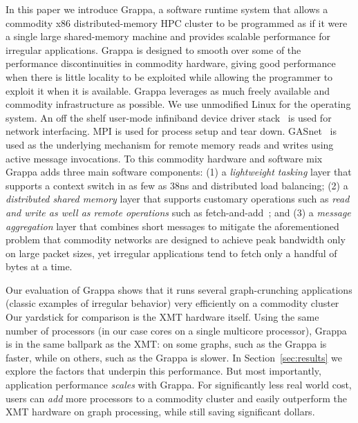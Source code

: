 In this paper we introduce Grappa, a software runtime system that allows
a commodity x86 distributed-memory HPC cluster to be programmed as if it
were a single large shared-memory machine and provides scalable
performance for irregular applications. Grappa is designed to smooth
over some of the performance discontinuities in commodity hardware,
giving good performance when there is little locality to be exploited
while allowing the programmer to exploit it when it is available. Grappa
leverages as much freely available and commodity infrastructure as
possible. We use unmodified Linux for the operating system. An off the
shelf user-mode infiniband device driver stack~\cite{OFED} is used
for network interfacing. MPI is used for process setup and
tear down. GASnet~\cite{gasnet:spec} is used as the underlying mechanism for
remote memory reads and writes using active message invocations. To this
commodity hardware and software mix Grappa adds three main software
components: (1) a \emph{lightweight tasking} layer that supports a
context switch in as few as 38ns and distributed load balancing; (2) a
\emph{distributed shared memory} layer that supports customary
operations such as \emph{read and write as well as remote operations}
such as fetch-and-add~\cite{fetchandadd}; and (3) a \emph{message
aggregation} layer that combines short messages to mitigate the
aforementioned problem that commodity networks are designed to achieve
peak bandwidth only on large packet sizes, yet irregular applications
tend to fetch only a handful of bytes at a time.


% 
% 

Our evaluation of Grappa shows that it runs several graph-crunching applications (classic examples of irregular behavior) very efficiently on a commodity cluster  Our yardstick for comparison is the XMT hardware itself.  Using the same number of processors (in our case cores on a single multicore processor), Grappa is in the same ballpark as the XMT: on some graphs, such as the  Grappa is  faster, while on others, such as the  Grappa is  slower.  In Section~\ref{sec:results} we explore the factors that underpin this performance.  But most importantly, application performance \emph{scales} with Grappa.  For significantly less real world cost, users can \emph{add} more processors to a commodity cluster and easily outperform the XMT hardware on graph processing, while still saving significant dollars.
% 


